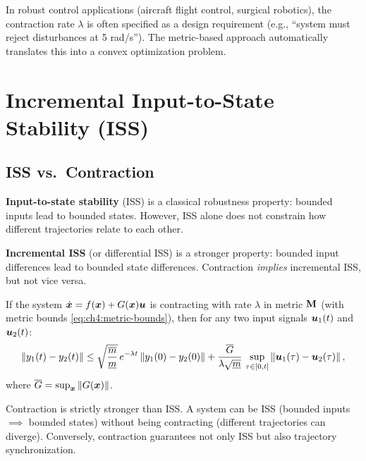 \begin{designbox}
In robust control applications (aircraft flight control, surgical robotics), the contraction
rate $\lambda$ is often specified as a design requirement (e.g., ``system must reject
disturbances at 5 rad/s''). The metric-based approach automatically translates this into
a convex optimization problem.
\end{designbox}


\section{Incremental Input-to-State Stability (ISS)}

\subsection{ISS vs.\ Contraction}

\textbf{Input-to-state stability} (ISS) is a classical robustness property: bounded inputs
lead to bounded states. However, ISS alone does not constrain how different trajectories
relate to each other.

\textbf{Incremental ISS} (or differential ISS) is a stronger property: bounded input differences
lead to bounded state differences. Contraction \emph{implies} incremental ISS, but not vice versa.

\begin{proposition}
\label{prop:ch4:contraction-iss}
If the system $\dot{\bm{x}} = f(\bm{x}) + G(\bm{x})\bm{u}$ is contracting with rate $\lambda$ in
metric $\mathbf{M}$ (with metric bounds \eqref{eq:ch4:metric-bounds}), then for any two
input signals $\bm{u}_1(t)$ and $\bm{u}_2(t)$:
\begin{equation}
\left\lVert y_1(t) - y_2(t) \right\rVert \leq \sqrt{\frac{\overline{m}}{\underline{m}}} \, e^{-\lambda t}
\left\lVert y_1(0) - y_2(0) \right\rVert + \frac{\overline{G}}{\lambda\sqrt{\underline{m}}} \, \sup_{\tau \in [0,t]}
\left\lVert \bm{u}_1(\tau) - \bm{u}_2(\tau) \right\rVert,
\label{eq:ch4:diff-ISS-bound}
\end{equation}
where $\overline{G} = \sup_{\bm{x}} \left\lVert G(\bm{x}) \right\rVert$.
\end{proposition}

\begin{remark}
Contraction is strictly stronger than ISS. A system can be ISS (bounded inputs $\implies$
bounded states) without being contracting (different trajectories can diverge). Conversely,
contraction guarantees not only ISS but also trajectory synchronization.
\end{remark}


